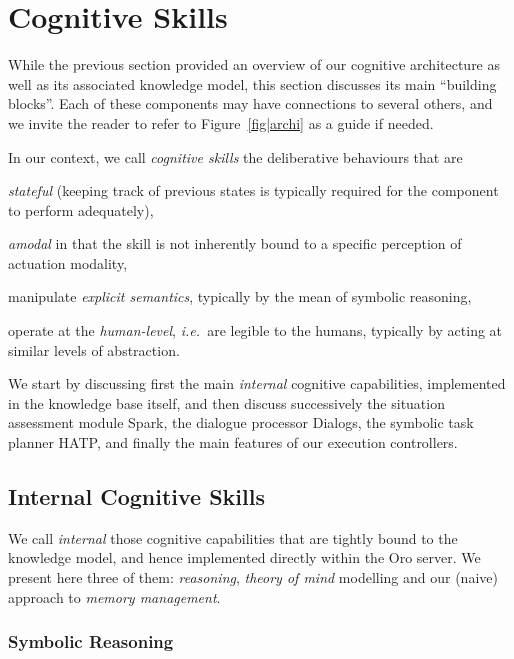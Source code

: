 \documentclass[preprint,3p,times]{elsarticle}
\newcommand{\ie}{{\textit{i.e.\ }}}
\begin{document}
\section{Cognitive Skills}
\label{sec:impl}

While the previous section provided an overview of our cognitive architecture
as well as its associated knowledge model, this section discusses its main
``building blocks''. Each of these components may have connections to several
others, and we invite the reader to refer to Figure~\ref{fig|archi} as a guide
if needed.

\begin{inparaenum} In our context, we call \emph{cognitive skills} the
deliberative behaviours that are \item \emph{stateful} (keeping track of
previous states is typically required for the component to perform adequately),
\item \emph{amodal} in that the skill is not inherently bound to a specific
perception of actuation modality, \item manipulate \emph{explicit semantics},
typically by the mean of symbolic reasoning, \item operate at the
    \emph{human-level}, \ie are legible to the humans, typically by acting at
similar levels of abstraction.\end{inparaenum}

We start by discussing first the main \emph{internal} cognitive capabilities,
implemented in the knowledge base itself, and then discuss successively the
situation assessment module {\sc Spark}, the dialogue processor {\sc Dialogs},
the symbolic task planner HATP, and finally the main features of our execution
controllers.

\subsection{Internal Cognitive Skills}
\label{sect|intern}

We call \emph{internal} those cognitive capabilities that are tightly bound to
the knowledge model, and hence implemented directly within the {\sc Oro} server.
We present here three of them: \emph{reasoning}, \emph{theory of mind} modelling
and our (naive) approach to \emph{memory management}.

\subsubsection{Symbolic Reasoning}
\label{reasoning}
\end{document}
